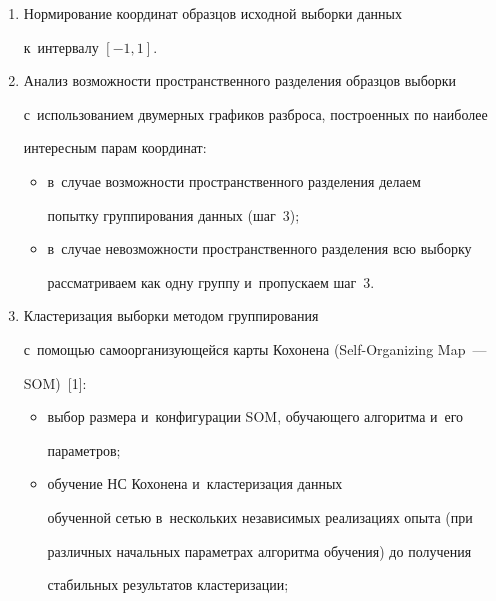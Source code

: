   \begin{enumerate}[1.]


\item Нормирование координат образцов исходной выборки данных 


к~интервалу $[-1, 1]$. %


\item Анализ возможности пространственного разделения образцов выборки 


с~использованием двумерных графиков разброса, построенных по наиболее 


интересным парам координат:\\[-15pt]


\begin{itemize}


\item в~случае возможности пространственного разделения делаем 


попытку группирования данных (шаг~3);\\[-15pt] 


\item в~случае невозможности пространственного разделения всю выборку 


рассматриваем как одну группу и~пропускаем шаг~3.


\end{itemize}


\item Кластеризация выборки методом группирования~\cite{7-anik} 


с~помощью самоорганизующейся карты Кохонена (Self-Organizing Map~--- 


SOM)~[1]:\\[-15pt]


\begin{itemize}


\item выбор размера и~конфигурации SOM, обучающего алгоритма и~его 


параметров;\\[-15pt]


\item обучение НС Кохонена и~кластеризация данных 


обученной сетью в~нескольких независимых реализациях опыта (при 


различных начальных параметрах алгоритма обучения) до получения 


стабильных результатов кластеризации;\\[-15pt] 



\end{itemize}
\end{enumerate}
